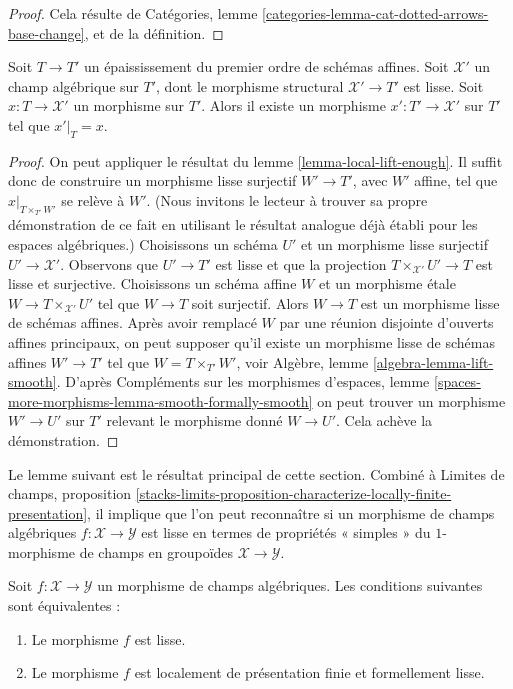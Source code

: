 \begin{proof}
Cela résulte de
Catégories, lemme \ref{categories-lemma-cat-dotted-arrows-base-change},
et de la définition.
\end{proof}

\begin{lemma}
\label{lemma-lift-to-smooth}
Soit $T \to T'$ un épaississement du premier ordre de schémas affines.
Soit $\mathcal{X}'$ un champ algébrique sur $T'$,
dont le morphisme structural $\mathcal{X}' \to T'$ est lisse.
Soit $x : T \to \mathcal{X}'$ un morphisme
sur $T'$. Alors il existe un morphisme $x' : T' \to \mathcal{X}'$
sur $T'$ tel que $x'|_T = x$.
\end{lemma}

\begin{proof}
On peut appliquer le résultat du lemme \ref{lemma-local-lift-enough}.
Il suffit donc de construire un morphisme lisse surjectif
$W' \to T'$, avec $W'$ affine, tel que
$x|_{T \times_{T'} W'}$ se relève à $W'$.
(Nous invitons le lecteur à trouver sa propre démonstration de ce fait
en utilisant le résultat analogue déjà établi
pour les espaces algébriques.) Choisissons un
schéma $U'$ et un morphisme lisse surjectif $U' \to \mathcal{X}'$.
Observons que $U' \to T'$ est lisse et que la projection
$T \times_{\mathcal{X}'} U' \to T$ est lisse et surjective.
Choisissons un schéma affine $W$ et un morphisme \'etale
$W \to T \times_{\mathcal{X}'} U'$ tel que $W \to T$
soit surjectif. Alors $W \to T$ est un morphisme lisse de
schémas affines. Après avoir remplacé $W$ par une réunion disjointe d'ouverts
affines principaux, on peut supposer qu'il existe un
morphisme lisse de schémas affines $W' \to T'$ tel que
$W = T \times_{T'} W'$, voir Algèbre, lemme \ref{algebra-lemma-lift-smooth}.
D'après Compléments sur les morphismes d'espaces, lemme
\ref{spaces-more-morphisms-lemma-smooth-formally-smooth}
on peut trouver un morphisme $W' \to U'$ sur $T'$ relevant
le morphisme donné $W \to U'$. Cela achève la démonstration.
\end{proof}

\noindent
Le lemme suivant est le résultat principal de cette section.
Combiné à
Limites de champs, proposition
\ref{stacks-limits-proposition-characterize-locally-finite-presentation},
il implique que l'on peut reconnaître si un morphisme de champs algébriques
$f : \mathcal{X} \to \mathcal{Y}$ est lisse en termes de
propriétés « simples » du $1$-morphisme de champs en groupoïdes
$\mathcal{X} \to \mathcal{Y}$.

\begin{lemma}
\label{lemma-smooth-formally-smooth}
Soit $f : \mathcal{X} \to \mathcal{Y}$ un morphisme de champs algébriques.
Les conditions suivantes sont équivalentes :
\begin{enumerate}
\item Le morphisme $f$ est lisse.
\item Le morphisme $f$ est localement de présentation finie et
formellement lisse.
\end{enumerate}
\end{lemma}

